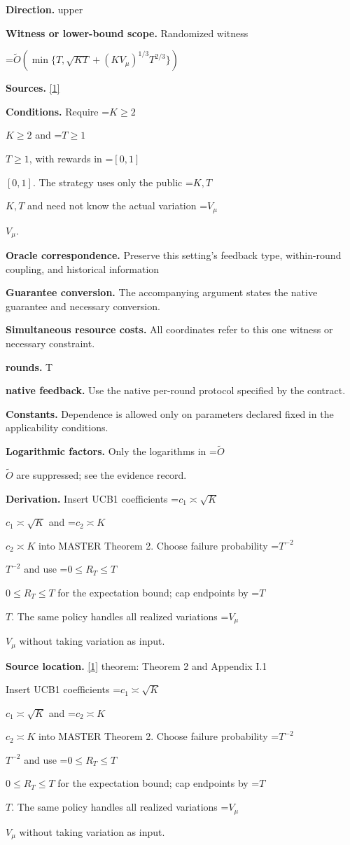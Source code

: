 \documentclass[10pt,a4paper]{article}
\newcommand{\AtlasMath}[1]{\par\begingroup\centering\setbox0=\hbox{$\displaystyle #1$}\ifdim\wd0>1.4\linewidth\typeout{ATLAS WIDE FORMULA: \the\wd0}\fi\ifdim\wd0>\linewidth\resizebox{\linewidth}{!}{\box0}\else\box0\fi\par\endgroup}
\newcommand{\AtlasInlineMath}[1]{\begingroup\setbox0=\hbox{$#1$}\ifdim\wd0>.4\linewidth\endgroup\AtlasMath{#1}\else\endgroup$#1$\fi}
\begin{document}
\textbf{Direction.} upper

\textbf{Witness or lower-bound scope.} Randomized witness

\AtlasMath{\widetilde{O}\!\left(\min\{T,\sqrt{KT}+(KV_\mu)^{1/3}T^{2/3}\}\right)}
\textbf{Sources.} \href{https://proceedings.mlr.press/v134/wei21b.html}{[1]}

\textbf{Conditions.} Require \AtlasInlineMath{K\ge2} and \AtlasInlineMath{T\ge1}, with rewards in \AtlasInlineMath{[0,1]}. The strategy uses only the public \AtlasInlineMath{K,T} and need not know the actual variation \AtlasInlineMath{V_\mu}.

\textbf{Oracle correspondence.} Preserve this setting's feedback type, within-round coupling, and historical information

\textbf{Guarantee conversion.} The accompanying argument states the native guarantee and necessary conversion.

\textbf{Simultaneous resource costs.} All coordinates refer to this one witness or necessary constraint.

\textbf{rounds.} T

\textbf{native feedback.} Use the native per-round protocol specified by the contract.

\textbf{Constants.} Dependence is allowed only on parameters declared fixed in the applicability conditions.

\textbf{Logarithmic factors.} Only the logarithms in \AtlasInlineMath{\widetilde O} are suppressed; see the evidence record.

\textbf{Derivation.} Insert UCB1 coefficients \AtlasInlineMath{c_1\asymp\sqrt K} and \AtlasInlineMath{c_2\asymp K} into MASTER Theorem 2. Choose failure probability \AtlasInlineMath{T^{-2}} and use \AtlasInlineMath{0\le R_T\le T} for the expectation bound; cap endpoints by \AtlasInlineMath{T}. The same policy handles all realized variations \AtlasInlineMath{V_\mu} without taking variation as input.

\textbf{Source location.} \href{https://proceedings.mlr.press/v134/wei21b.html}{[1]} theorem: Theorem 2 and Appendix I.1

Insert UCB1 coefficients \AtlasInlineMath{c_1\asymp\sqrt K} and \AtlasInlineMath{c_2\asymp K} into MASTER Theorem 2. Choose failure probability \AtlasInlineMath{T^{-2}} and use \AtlasInlineMath{0\le R_T\le T} for the expectation bound; cap endpoints by \AtlasInlineMath{T}. The same policy handles all realized variations \AtlasInlineMath{V_\mu} without taking variation as input.
\end{document}
